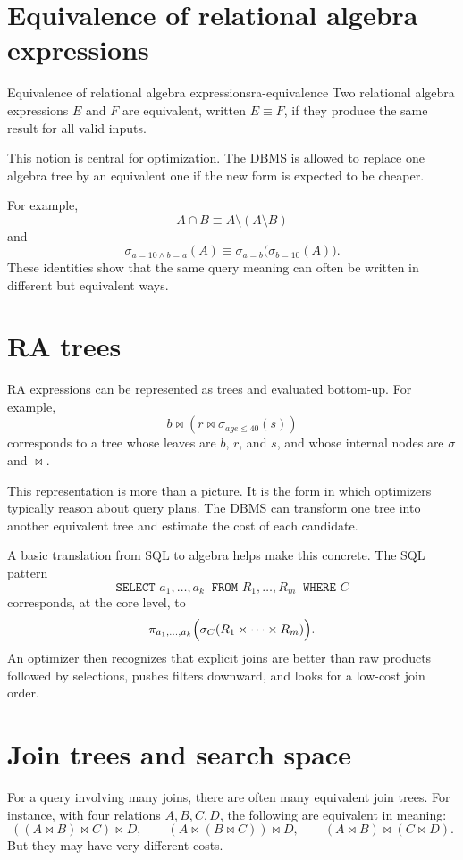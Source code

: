 \documentclass[11pt,a4paper,openany]{book}
\newcommand{\RAselect}{\sigma}
\newcommand{\RAproject}{\pi}
\newcommand{\join}{\bowtie}
\begin{document}
\section{Equivalence of relational algebra expressions}
\begin{definition}{Equivalence of relational algebra expressions}{ra-equivalence}
Two relational algebra expressions \(E\) and \(F\) are equivalent, written \(E\equiv F\), if they produce the same result for all valid inputs.
\end{definition}

This notion is central for optimization. The DBMS is allowed to replace one algebra tree by an equivalent one if the new form is expected to be cheaper.

For example,
\[
A\cap B \equiv A\setminus (A\setminus B)
\]
and
\[
\RAselect_{a=10\wedge b=a}(A)\equiv \RAselect_{a=b}\bigl(\RAselect_{b=10}(A)\bigr).
\]
These identities show that the same query meaning can often be written in different but equivalent ways.

\section{RA trees}
RA expressions can be represented as trees and evaluated bottom-up. For example,
\[
b \join (r \join \RAselect_{age\le 40}(s))
\]
corresponds to a tree whose leaves are \(b\), \(r\), and \(s\), and whose internal nodes are \(\sigma\) and \(\join\).

This representation is more than a picture. It is the form in which optimizers typically reason about query plans. The DBMS can transform one tree into another equivalent tree and estimate the cost of each candidate.

A basic translation from SQL to algebra helps make this concrete. The SQL pattern
\[
\texttt{SELECT }a_1,\dots,a_k\ \texttt{ FROM }R_1,\dots,R_m\ \texttt{ WHERE }C
\]
corresponds, at the core level, to
\[
\RAproject_{a_1,\dots,a_k}\Bigl(\RAselect_C(R_1\times \cdots \times R_m)\Bigr).
\]
An optimizer then recognizes that explicit joins are better than raw products followed by selections, pushes filters downward, and looks for a low-cost join order.

\section{Join trees and search space}
For a query involving many joins, there are often many equivalent join trees. For instance, with four relations \(A,B,C,D\), the following are equivalent in meaning:
\[
((A\join B)\join C)\join D,
\qquad
(A\join (B\join C))\join D,
\qquad
(A\join B)\join (C\join D).
\]
But they may have very different costs.
\end{document}
